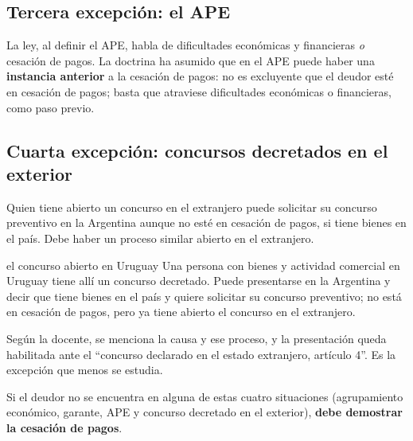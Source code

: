 \documentclass[12pt,oneside]{book}
\begin{document}
\subsection{Tercera excepción: el APE}

La ley, al definir el APE, habla de dificultades económicas y financieras \emph{o} cesación de pagos. La doctrina ha asumido que en el APE puede haber una \textbf{instancia anterior} a la cesación de pagos: no es excluyente que el deudor esté en cesación de pagos; basta que atraviese dificultades económicas o financieras, como paso previo.

\subsection{Cuarta excepción: concursos decretados en el exterior}

Quien tiene abierto un concurso en el extranjero puede solicitar su concurso preventivo en la Argentina aunque no esté en cesación de pagos, si tiene bienes en el país. Debe haber un proceso similar abierto en el extranjero.

\begin{example}{el concurso abierto en Uruguay}
Una persona con bienes y actividad comercial en Uruguay tiene allí un concurso decretado. Puede presentarse en la Argentina y decir que tiene bienes en el país y quiere solicitar su concurso preventivo; no está en cesación de pagos, pero ya tiene abierto el concurso en el extranjero.
\end{example}

Según la docente, se menciona la causa y ese proceso, y la presentación queda habilitada ante el ``concurso declarado en el estado extranjero, artículo 4''. Es la excepción que menos se estudia.

\begin{important}
Si el deudor no se encuentra en alguna de estas cuatro situaciones (agrupamiento económico, garante, APE y concurso decretado en el exterior), \textbf{debe demostrar la cesación de pagos}.
\end{important}
\end{document}
